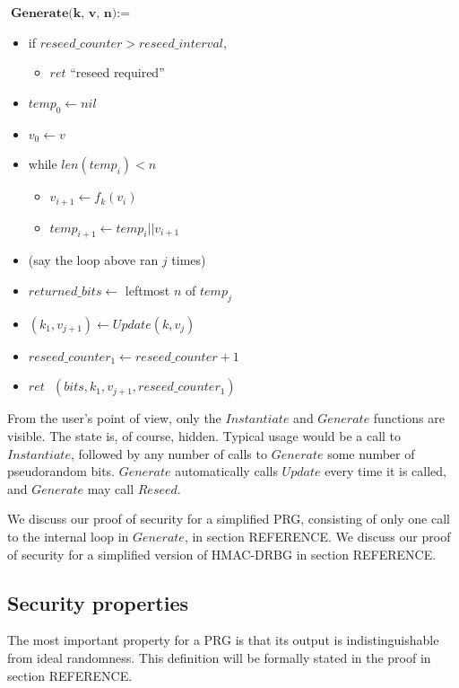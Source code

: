 \documentclass[12pt,lot, lof]{puthesis}
\newenvironment{game}
{ \begin{itemize}[noitemsep,nolistsep] 
}
{ \end{itemize}                  }
\newcommand{\s} {\textrm{ }}
\newcommand{\f}{\frac}
\newcommand{\lar}{\leftarrow}
\begin{document}
$\textbf{Generate(k, v, n)} := $
\begin{game}
\item[] if $reseed\_counter > reseed\_interval$, 
  \begin{game}
  \item[] $ret$ ``reseed required''
  \end{game}
\item[] $temp_0 \lar nil$
\item[] $v_0 \lar v$
\item[] while $len(temp_i) < n$
  \begin{game}
    \item[] $v_{i+1} \lar f_k(v_i)$
    \item[] $temp_{i+1} \lar temp_i || v_{i+1}$
  \end{game}
\item[] (say the loop above ran $j$ times)
\item[] $returned\_bits \lar$ leftmost $n$ of $temp_j$
\item[] $(k_1, v_{j+1}) \lar Update(k, v_j)$
\item[] $reseed\_counter_1 \lar reseed\_counter + 1$
\item[] $ret \s (bits, k_1, v_{j+1}, reseed\_counter_1)$\\
\end{game}

From the user's point of view, only the $Instantiate$ and $Generate$ functions are visible. The state is, of course, hidden. Typical usage would be a call to $Instantiate$, followed by any number of calls to $Generate$ some number of pseudorandom bits. $Generate$ automatically calls $Update$ every time it is called, and $Generate$ may call $Reseed$.

We discuss our proof of security for a simplified PRG, consisting of only one call to the internal loop in $Generate$, in section REFERENCE. We discuss our proof of security for a simplified version of HMAC-DRBG in section REFERENCE.

\subsection{Security properties}

The most important property for a PRG is that its output is indistinguishable from ideal randomness. This definition will be formally stated in the proof in section REFERENCE.
\end{document}
